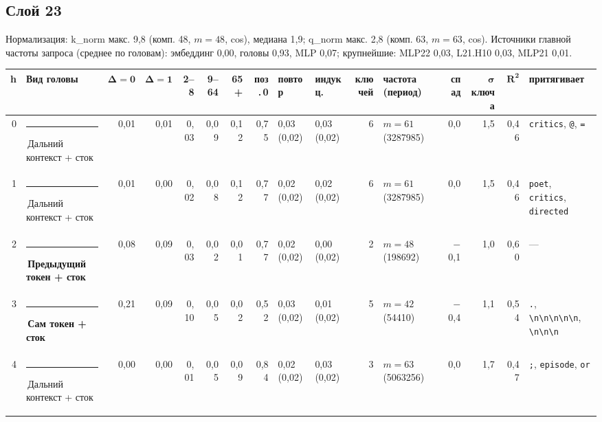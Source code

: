\documentclass[10pt]{article}
\begin{document}
\noindent\begin{minipage}{\linewidth}
\subsection*{Слой 23}
{\small\color{ink2} Нормализация: k\_norm макс. 9,8 (комп. 48, $m{=}48$, cos), медиана 1,9; q\_norm макс. 2,8 (комп. 63, $m{=}63$, cos). Источники главной частоты запроса (среднее по головам): эмбеддинг 0,00, головы 0,93, MLP 0,07; крупнейшие: MLP22 0,03, L21.H10 0,03, MLP21 0,01.}
\begin{center}{\footnotesize\begin{tabular}{|r|l|r|r|r|r|r|r|l|l|r|l|r|r|r|l|}
\hline
\rowcolor{head}\textbf{h} & \textbf{Вид головы} & $\boldsymbol{\Delta{=}0}$ & $\boldsymbol{\Delta{=}1}$ & \textbf{2–8} & \textbf{9–64} & \textbf{65+} & \textbf{поз.\,0} & \textbf{повтор} & \textbf{индукц.} & \textbf{ключей} & \textbf{частота (период)} & \textbf{спад} & $\boldsymbol{\sigma}$ \textbf{ключа} & $\boldsymbol{R^2}$ & \textbf{притягивает} \\ \hline
0 & \textcolor[HTML]{C3C2B7}{\rule{0.62em}{0.62em}}\,Дальний контекст + сток & 0,01 & 0,01 & 0,03 & 0,09 & 0,12 & 0,75 & 0,03 (0,02) & 0,03 (0,02) & 6 & $m{=}61$ (3287985) & 0,0 & 1,5 & 0,46 & \texttt{\textvisiblespace{}critics}, \texttt{\textvisiblespace{}@}, \texttt{\textvisiblespace{}=} \\ \hline
1 & \textcolor[HTML]{C3C2B7}{\rule{0.62em}{0.62em}}\,Дальний контекст + сток & 0,01 & 0,00 & 0,02 & 0,08 & 0,12 & 0,77 & 0,02 (0,02) & 0,02 (0,02) & 6 & $m{=}61$ (3287985) & 0,0 & 1,5 & 0,46 & \texttt{\textvisiblespace{}poet}, \texttt{\textvisiblespace{}critics}, \texttt{\textvisiblespace{}directed} \\ \hline
2 & \textcolor[HTML]{2A78D6}{\rule{0.62em}{0.62em}}\,\textbf{Предыдущий токен + сток} & 0,08 & 0,09 & 0,03 & 0,02 & 0,01 & 0,77 & 0,02 (0,02) & 0,00 (0,02) & 2 & $m{=}48$ (198692) & $-$0,1 & 1,0 & 0,60 & — \\ \hline
3 & \textcolor[HTML]{2A78D6}{\rule{0.62em}{0.62em}}\,\textbf{Сам токен + сток} & 0,21 & 0,09 & 0,10 & 0,05 & 0,02 & 0,52 & 0,03 (0,02) & 0,01 (0,02) & 5 & $m{=}42$ (54410) & $-$0,4 & 1,1 & 0,54 & \texttt{\textvisiblespace{}.}, \texttt{\textvisiblespace{}\textbackslash{}n\textbackslash{}n\textbackslash{}n\textbackslash{}n\textbackslash{}n}, \texttt{\textvisiblespace{}\textbackslash{}n\textbackslash{}n\textbackslash{}n} \\ \hline
4 & \textcolor[HTML]{C3C2B7}{\rule{0.62em}{0.62em}}\,Дальний контекст + сток & 0,00 & 0,00 & 0,01 & 0,05 & 0,09 & 0,84 & 0,02 (0,02) & 0,03 (0,02) & 3 & $m{=}63$ (5063256) & 0,0 & 1,7 & 0,47 & \texttt{\textvisiblespace{};}, \texttt{\textvisiblespace{}episode}, \texttt{\textvisiblespace{}or} \\ \hline

\end{tabular}}
\end{center}
\end{minipage}
\end{document}
